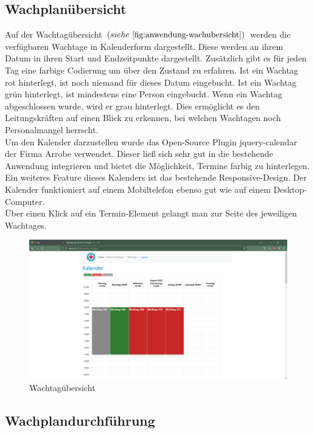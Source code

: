 \documentclass[fontsize=12pt,openright,oneside,paper=a4,BCOR=1cm]{scrbook}
\begin{document}
\subsection{Wachplanübersicht}

Auf der Wachtag\"ubersicht $(siehe~\ref{fig:anwendung-wachubersicht})$ werden die verf\"ugbaren Wachtage in Kalenderform dargestellt. Diese werden an ihrem Datum in ihren Start und Endzeitpunkte dargestellt. Zus\"atzlich gibt es f\"ur jeden Tag eine farbige Codierung um \"uber den Zustand zu erfahren. Ist ein Wachtag rot hinterlegt, ist noch niemand f\"ur dieses Datum eingebucht. Ist ein Wachtag gr\"un hinterlegt, ist mindestens eine Person eingebucht. Wenn ein Wachtag abgeschlossen wurde, wird er grau hinterlegt. Dies erm\"oglicht es den Leitungskr\"aften auf einen Blick zu erkennen, bei welchen Wachtagen noch Personalmangel herrscht. \\
Um den Kalender darzustellen wurde das Open-Source Plugin \glqq jquery-calendar\grqq{} der Firma \glqq Arrobe\grqq{} verwendet. Dieser ließ sich sehr gut in die bestehende Anwendung integrieren und bietet die M\"oglichkeit, Termine farbig zu hinterlegen. Ein weiteres Feature dieses Kalenders ist das bestehende Responsive-Design. Der Kalender funktioniert auf einem Mobiltelefon ebenso gut wie auf einem Desktop-Computer. \\
\"Uber einen Klick auf ein Termin-Element gelangt man zur Seite des jeweiligen Wachtages.

\begin{figure}[H]
  \centering
    \includegraphics[width=0.7\linewidth]{Anlagen/Anwendung/7UebersichtGebucht.png}
    \caption{Wachtag\"ubersicht}
  \label{fig:anwendung-wachubersicht}
\end{figure}

\subsection {Wachplandurchführung}
\end{document}
